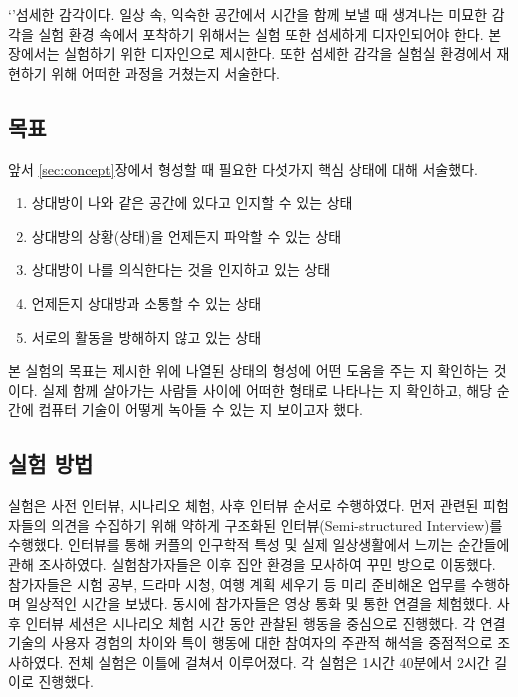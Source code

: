 `\concept'\는 섬세한 감각이다. 일상 속, 익숙한 공간에서 시간을 함께 보낼 때 생겨나는 미묘한 감각을 실험 환경 속에서 포착하기 위해서는 실험 또한 섬세하게 디자인되어야 한다. 본 장에서는 \concept\를 실험하기 위한 디자인으로 \expUser\를 제시한다. 또한 섬세한 감각을 실험실 환경에서 재현하기 위해 어떠한 과정을 거쳤는지 서술한다.

\subsection{목표}
\label{subsec:exp_goal}

앞서 \ref{sec:concept}장에서 \concept\를 형성할 때 필요한 다섯가지 핵심 상태에 대해 서술했다.

\begin{center}
\begin{minipage}{.6\textwidth}
\begin{enumerate}[label=\Roman*., noitemsep]
	\item 상대방이 나와 같은 공간에 있다고 인지할 수 있는 상태
	\item 상대방의 상황(상태)을 언제든지 파악할 수 있는 상태
	\item 상대방이 나를 의식한다는 것을 인지하고 있는 상태
	\item 언제든지 상대방과 소통할 수 있는 상태
	\item 서로의 활동을 방해하지 않고 있는 상태
\end{enumerate}
\end{minipage}
\end{center}

\noindent 본 실험의 목표는 제시한 \sysname\이 위에 나열된 상태의 형성에 어떤 도움을 주는 지 확인하는 것이다. 실제 함께 살아가는 사람들 사이에 \concept\가 어떠한 형태로 나타나는 지 확인하고, 해당 순간에 컴퓨터 기술이 어떻게 녹아들 수 있는 지 보이고자 했다.


\subsection{실험 방법}

실험은 사전 인터뷰, 시나리오 체험, 사후 인터뷰 순서로 수행하였다.
먼저 \concept\와 관련된 피험자들의 의견을 수집하기 위해 약하게 구조화된 인터뷰(Semi-structured Interview)를 수행했다. 인터뷰를 통해 커플의 인구학적 특성 및 실제 일상생활에서 \concept\를 느끼는 순간들에 관해 조사하였다.
실험참가자들은 이후 집안 환경을 모사하여 꾸민 방으로 이동했다. 참가자들은 시험 공부, 드라마 시청, 여행 계획 세우기 등 미리 준비해온 업무를 수행하며 일상적인 시간을 보냈다. 동시에 참가자들은 영상 통화 및 \sysname\을 통한 연결을 체험했다.
사후 인터뷰 세션은 시나리오 체험 시간 동안 관찰된 행동을 중심으로 진행했다. 각 연결 기술의 사용자 경험의 차이와 특이 행동에 대한 참여자의 주관적 해석을 중점적으로 조사하였다.
전체 실험은 이틀에 걸쳐서 이루어졌다. 각 실험은 1시간 40분에서 2시간 길이로 진행했다.

